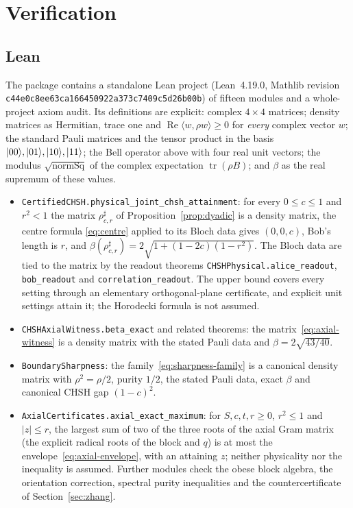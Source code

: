 \documentclass[11pt]{article}
\theoremstyle{remark}\newtheorem{remark}[theorem]{Remark}
\DeclareMathOperator{\tr}{tr}\DeclareMathOperator{\diag}{diag}
\begin{document}
\section{Verification}\label{sec:formal}

\subsection{Lean}
The package contains a standalone Lean project (Lean~4.19.0, Mathlib
revision \texttt{c44e0c8ee63ca166\allowbreak450922a373c7409c\allowbreak5d26b00b}) of fifteen modules and a
whole-project axiom audit. Its definitions are explicit: complex $4\times4$
matrices; density matrices as Hermitian, trace one and
$\operatorname{Re}\langle w,\rho w\rangle\ge0$ for \emph{every} complex vector
$w$; the standard Pauli matrices and the tensor product in the basis
$|00\rangle,|01\rangle,|10\rangle,|11\rangle$; the Bell operator above with four real
unit vectors; the modulus $\sqrt{\operatorname{normSq}}$ of the complex
expectation $\tr(\rho B)$; and $\beta$ as the real supremum of these values.
\begin{itemize}
\item \texttt{CertifiedCHSH.physical\_joint\_chsh\_attainment}: for every
$0\le c\le1$ and $r^2<1$ the matrix $\rho^\sharp_{c,r}$ of
Proposition~\ref{prop:dyadic} is a density matrix, the centre formula
\eqref{eq:centre} applied to its Bloch data gives $(0,0,c)$, Bob's length is
$r$, and $\beta(\rho^\sharp_{c,r})=2\sqrt{1+(1-2c)(1-r^2)}$. The Bloch data are
tied to the matrix by the readout theorems
\texttt{CHSHPhysical.alice\_readout}, \texttt{bob\_readout} and
\texttt{correlation\_readout}. The upper bound covers every setting through an
elementary orthogonal-plane certificate, and explicit unit settings attain it;
the Horodecki formula is not assumed.
\item \texttt{CHSHAxialWitness.beta\_exact} and related theorems:
the matrix~\eqref{eq:axial-witness} is a density matrix with the stated Pauli
data and $\beta=2\sqrt{43/40}$.
\item \texttt{BoundarySharpness}: the family~\eqref{eq:sharpness-family} is a
canonical density matrix with $\rho^2=\rho/2$, purity $1/2$, the stated Pauli
data, exact $\beta$ and canonical CHSH gap $(1-c)^2$.
\item \texttt{AxialCertificates.axial\_exact\_maximum}: for $S,c,t,r\ge0$,
$r^2\le1$ and $|z|\le r$, the largest sum of two of the three roots of the
axial Gram matrix (the explicit radical roots of the block and $q$) is at most
the envelope~\eqref{eq:axial-envelope}, with an attaining $z$; neither
physicality nor the inequality is assumed. Further modules check the obese
block algebra, the orientation correction, spectral purity inequalities and
the countercertificate of Section~\ref{sec:zhang}.
\end{itemize}
\end{document}
